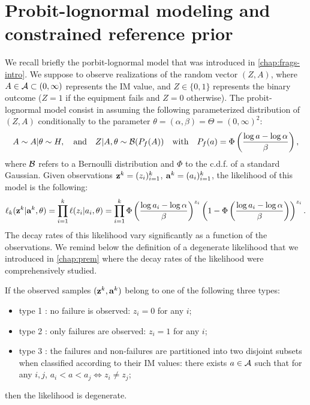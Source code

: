 \section{Probit-lognormal modeling and constrained reference prior}\label{sec:doe:model}

We recall briefly the porbit-lognormal model that was introduced in \cref{chap:frags-intro}. We suppose to observe realizations of the random vector $(Z,A)$, where $A\in\mathcal{A}\subset(0,\infty)$ represents the IM value, and $Z\in\{0,1\}$ represents the binary outcome ($Z=1$ if the equipment fails and $Z=0$ otherwise).
The probit-lognormal model consist in assuming the following parameterized distribution of $(Z,A)$ conditionally to the parameter $\theta=(\alpha,\beta)=\Theta=(0,\infty)^2$:
    \begin{equation}
        A\sim A|\theta\sim H,\quad\text{and}\quad Z|A,\theta\sim\mathcal{B}(P_f(A))\quad\text{with}\quad P_f(a)=\Phi\left(\frac{\log a-\log\alpha}{\beta}\right),
    \end{equation}
where $\mathcal{B}$ refers to a Bernoulli distribution and $\Phi$ to the c.d.f. of a standard Gaussian.
Given observations $\mathbf{z}^k=(z_i)_{i=1}^k$, $\mathbf{a}^k=(a_i)_{i=1}^k$, the likelihood of this model is the following:
    \begin{equation}
        \ell_k(\mathbf{z}^k|\mathbf{a}^k,\theta) = \prod_{i=1}^{k}\ell(z_i|a_i,\theta) = \prod_{i=1}^k\Phi\left(\frac{\log a_i-\log\alpha}{\beta}\right)^{z_i}\left(1-\Phi\left(\frac{\log a_i-\log\alpha}{\beta}\right)\right)^{z_i}.
    \end{equation}
The decay rates of this likelihood vary significantly as a function of the observations. We remind below the definition of a degenerate likelihood that we introduced in \cref{chap:prem} where the decay rates of the likelihood were comprehensively studied.

\begin{defi}\label{def:doe:degeneracy}
    If the observed samples $(\mathbf{z}^k,\mathbf{a}^k)$ belong to one of the following three types:
    \begin{itemize}
        \item
        type 1 : no failure is observed: $z_i=0$ for any $i$;
        \item type 2 : only failures are observed: $z_i=1$ for any $i$;
        \item type 3 : the failures and non-failures are partitioned into two disjoint subsets when classified according to their IM values:
        there exists $a\in\mathcal{A}$ such that for any $i,j$, $a_i<a<a_j\Longleftrightarrow z_i\ne z_j$; %
    \end{itemize}
    then the likelihood is degenerate.
\end{defi}





